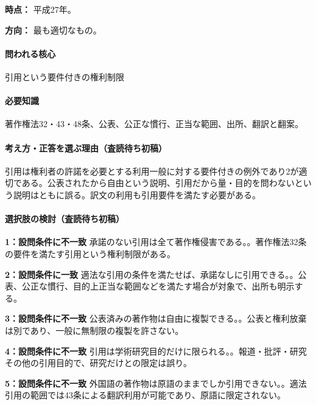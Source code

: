 \noindent\textbf{時点：} 平成27年。\par

\noindent\textbf{方向：} 最も適切なもの。\par

\paragraph{問われる核心} 引用という要件付きの権利制限

\paragraph{必要知識} 著作権法32・43・48条、公表、公正な慣行、正当な範囲、出所、翻訳と翻案。

\paragraph{考え方・正答を選ぶ理由（査読待ち初稿）} 引用は権利者の許諾を必要とする利用一般に対する要件付きの例外であり2が適切である。公表されたから自由という説明、引用だから量・目的を問わないという説明はともに誤る。訳文の利用も引用要件を満たす必要がある。

\paragraph{選択肢の検討（査読待ち初稿）}\mbox{}\par

\noindent\textbf{1：設問条件に不一致} 承諾のない引用は全て著作権侵害である。。著作権法32条の要件を満たす引用という権利制限がある。\par

\noindent\textbf{2：設問条件に一致} 適法な引用の条件を満たせば、承諾なしに引用できる。。公表、公正な慣行、目的上正当な範囲などを満たす場合が対象で、出所も明示する。\par

\noindent\textbf{3：設問条件に不一致} 公表済みの著作物は自由に複製できる。。公表と権利放棄は別であり、一般に無制限の複製を許さない。\par

\noindent\textbf{4：設問条件に不一致} 引用は学術研究目的だけに限られる。。報道・批評・研究その他の引用目的で、研究だけとの限定は誤り。\par

\noindent\textbf{5：設問条件に不一致} 外国語の著作物は原語のままでしか引用できない。。適法引用の範囲では43条による翻訳利用が可能であり、原語に限定されない。\par

